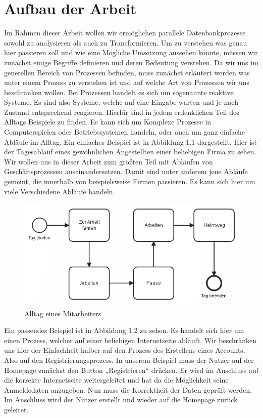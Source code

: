\section{Aufbau der Arbeit}
Im Rahmen dieser Arbeit wollen wir ermöglichen parallele Datenbankprozesse sowohl zu analysieren als auch zu Transformieren. Um zu verstehen was genau hier passieren soll und wie eine Mögliche Umsetzung aussehen könnte, müssen wir zunächst einige Begriffe definieren und deren Bedeutung verstehen. Da wir uns im generellen Bereich von Prozessen befinden, muss zunächst erläutert werden was unter einem Prozess zu verstehen ist und auf welche Art von Prozessen wir uns beschränken wollen.
Bei Prozessen handelt es sich um sogenannte reaktive Systeme. Es sind also Systeme, welche auf eine Eingabe warten und je nach Zustand entsprechend reagieren. Hierfür sind in jedem erdenklichen Teil des Alltags Beispiele zu finden. Es kann sich um Komplexe Prozesse in Computerspielen oder Betriebssystemen handeln, oder auch um ganz einfache Abläufe im Alltag. Ein einfaches Beispiel ist in Abbildung 1.1 dargestellt. Hier ist der Tagesablauf eines gewöhnlichen Angestellten einer beliebigen Firma zu sehen.\\
Wir wollen uns in dieser Arbeit zum größten Teil mit Abläufen von Geschäftsprozessen auseinandersetzen. Damit sind unter anderem jene Abläufe gemeint, die innerhalb von beispielsweise Firmen passieren. Es kann sich hier um viele Verschiedene Abläufe handeln.\\
\begin{figure}
\centering
\includegraphics[scale=0.7]{Figures/Einleitungbsp1}
\decoRule
\caption[Alltag eines Mitarbeiters]{Alltag eines Mitarbeiters}
\label{fig:Task}
\end{figure}
Ein passendes Beispiel ist in Abbildung 1.2 zu sehen. Es handelt sich hier um einen Prozess, welcher auf einer beliebigen Internetseite abläuft. Wir beschränken uns hier der Einfachheit halber auf den Prozess des Erstellens eines Accounts. Also auf den Registrierungsprozess. In unserem Beispiel muss der Nutzer auf der Homepage zunächst den Button „Registrieren“ drücken. Er wird im Anschluss auf die korrekte Internetseite weitergeleitet und hat da die Möglichkeit seine Anmeldedaten anzugeben. Nun muss die Korrektheit der Daten geprüft werden. Im Anschluss wird der Nutzer erstellt und wieder auf die Homepage zurück geleitet.\\
